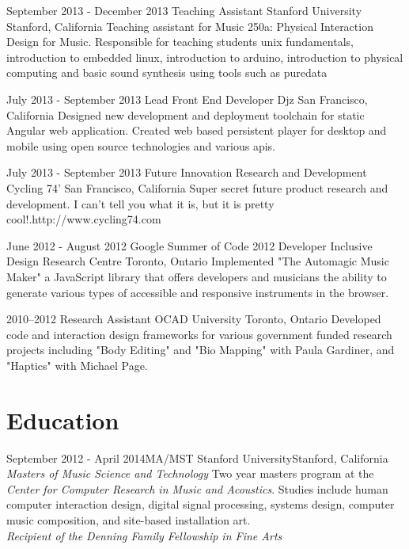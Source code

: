 \documentclass[10pt,a4paper,sans]{moderncv}   %
\begin{document}
\cventry
  {September 2013 - December 2013}
  {Teaching Assistant}
  {Stanford University}
  {Stanford, California}{}
  {Teaching assistant for Music 250a: Physical Interaction Design for Music.  Responsible for teaching students unix fundamentals, introduction to embedded linux, introduction to arduino, introduction to physical computing and basic sound synthesis using tools such as puredata}

\cventry
  {July 2013 - September 2013}
  {Lead Front End Developer}
  {Djz}
  {San Francisco, California}{}
  {Designed new development and deployment toolchain for static Angular web application.  Created web based persistent player for desktop and mobile using open source technologies and various apis.}

\cventry
  {July 2013 - September 2013}
  {Future Innovation Research and Development}
  {Cycling 74'}
  {San Francisco, California}{}
  {Super secret future product research and development. I can't tell you what it is, but it is pretty cool!.\newline{}http://www.cycling74.com}

\cventry
  {June 2012 - August 2012}
  {Google Summer of Code 2012 Developer}
  {Inclusive Design Research Centre}
  {Toronto, Ontario}{}
  {Implemented "The Automagic Music Maker" a JavaScript library that offers developers and musicians the ability to generate various types of accessible and responsive instruments in the browser.}

 \cventry
   {2010--2012}
   {Research Assistant}
   {OCAD University}
   {Toronto, Ontario}{}
   {Developed code and interaction design frameworks for various government funded research projects including "Body Editing" and "Bio Mapping" with Paula Gardiner, and "Haptics" with Michael Page.}

\section{Education}

\cventry
  {September 2012 - April 2014}{MA/MST}
  {Stanford University}{Stanford, California}
  {\textit{Masters of Music Science and Technology}}
  {Two year masters program at the \textit{Center for Computer Research in Music and Acoustics}.  Studies include human computer interaction design, digital signal processing, systems design, computer music composition, and site-based installation art. \\\textit{Recipient of the Denning Family Fellowship in Fine Arts }}
\end{document}
